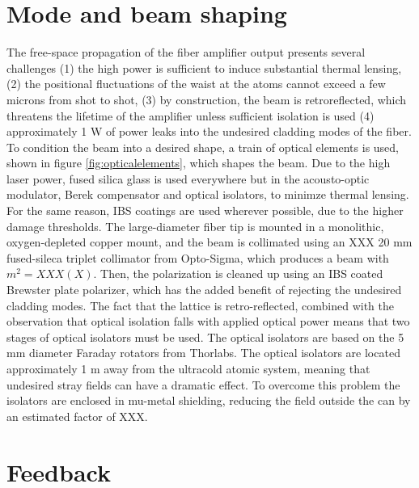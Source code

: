 \documentclass[twocolumn,aps,pra,showpacs,preprintnumbers,bibnotes]{revtex4-1}
\begin{document}
\section{Mode and beam shaping}
The free-space propagation of the fiber amplifier output presents several challenges (1) the high power is sufficient to induce substantial thermal lensing, (2) the positional fluctuations of the waist at the atoms cannot exceed 
a few microns from shot to shot, (3) by construction, the beam is retroreflected, which threatens the lifetime of the amplifier unless sufficient isolation is used (4) approximately 1 W of power leaks into the undesired cladding modes of the fiber. 
To condition the beam into a desired shape, a train of optical elements is used, shown in figure \ref{fig:opticalelements}, which shapes the beam. 
Due to the high laser power, fused silica glass is used everywhere but in the acousto-optic modulator, Berek compensator and optical isolators, to minimze thermal lensing.
For the same reason, IBS coatings are used wherever possible, due to the higher damage thresholds.
The large-diameter fiber tip is mounted in a monolithic, oxygen-depleted copper mount, and the beam is collimated using an XXX 20 mm fused-sileca triplet collimator from Opto-Sigma, which produces a beam with $m^2 = XXX(X)$.
Then, the polarization is cleaned up using an IBS coated Brewster plate polarizer, which has the added benefit of rejecting the undesired cladding modes. 
The fact that the lattice is retro-reflected, combined with the observation that optical isolation falls with applied optical power\cite{LIGO} means that two stages of optical isolators must be used. The optical isolators are based on the 5 mm diameter Faraday rotators from Thorlabs. 
The optical isolators are located approximately 1 m away from the ultracold atomic system, meaning that undesired stray fields can have a dramatic effect.
To overcome this problem the isolators are enclosed in mu-metal shielding, reducing the field outside the can by an estimated factor of XXX.

\section{Feedback}
\end{document}
